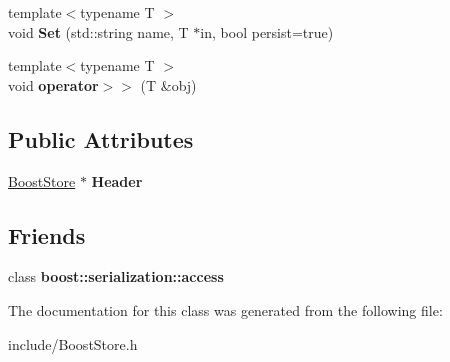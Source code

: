 \begin{DoxyCompactItemize}
\item 
\hypertarget{classBoostStore_a198a7f41e16912b439b85523f802ad0f}{{\footnotesize template$<$typename T $>$ }\\void {\bfseries Set} (std\-::string name, T $\ast$in, bool persist=true)}\label{classBoostStore_a198a7f41e16912b439b85523f802ad0f}

\item 
\hypertarget{classBoostStore_a4f1bce161785c396eb407adf3ab4491e}{{\footnotesize template$<$typename T $>$ }\\void {\bfseries operator$>$$>$} (T \&obj)}\label{classBoostStore_a4f1bce161785c396eb407adf3ab4491e}

\end{DoxyCompactItemize}
\subsection*{Public Attributes}
\begin{DoxyCompactItemize}
\item 
\hypertarget{classBoostStore_a3bfb8ffc972b7f0318b17018eaa37af2}{\hyperlink{classBoostStore}{Boost\-Store} $\ast$ {\bfseries Header}}\label{classBoostStore_a3bfb8ffc972b7f0318b17018eaa37af2}

\end{DoxyCompactItemize}
\subsection*{Friends}
\begin{DoxyCompactItemize}
\item 
\hypertarget{classBoostStore_ac98d07dd8f7b70e16ccb9a01abf56b9c}{class {\bfseries boost\-::serialization\-::access}}\label{classBoostStore_ac98d07dd8f7b70e16ccb9a01abf56b9c}

\end{DoxyCompactItemize}


The documentation for this class was generated from the following file\-:\begin{DoxyCompactItemize}
\item 
include/Boost\-Store.\-h\end{DoxyCompactItemize}
